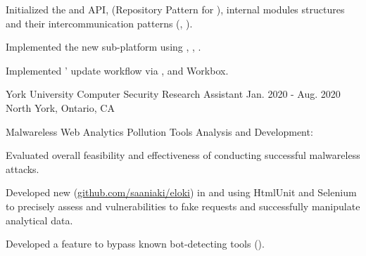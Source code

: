 \begin{cventries}
{\begin{cvitems}
        \begin{cvsubitems}
          \item {Initialized the  and  API,  (Repository Pattern for ), internal modules structures and their intercommunication patterns (, )}.
          \item {Implemented the new sub-platform using , , }.
        \end{cvsubitems}
        \item {Implemented ' update workflow via ,  and Workbox}.
    \end{cvitems}
  }

  \cventry
    {York University} %
    {Computer Security Research Assistant} %
    {Jan. 2020 - Aug. 2020} %
    {North York, Ontario, CA} %
    {
      \begin{cvitems} %
        \item {Malwareless Web Analytics Pollution Tools Analysis and Development:}
          \begin{cvsubitems}
            \item {Evaluated overall feasibility and effectiveness of conducting successful malwareless attacks.}
            \item {Developed new  (\underline{\href{https://github.com/saaniaki/eloki}{github.com/saaniaki/eloki}}) in  and  using HtmlUnit and Selenium to precisely assess  and  vulnerabilities to fake requests and successfully manipulate analytical data.}
            \item {Developed a feature to bypass known bot-detecting tools ().}
          \end{cvsubitems}
      \end{cvitems}
    }


\end{cventries}
